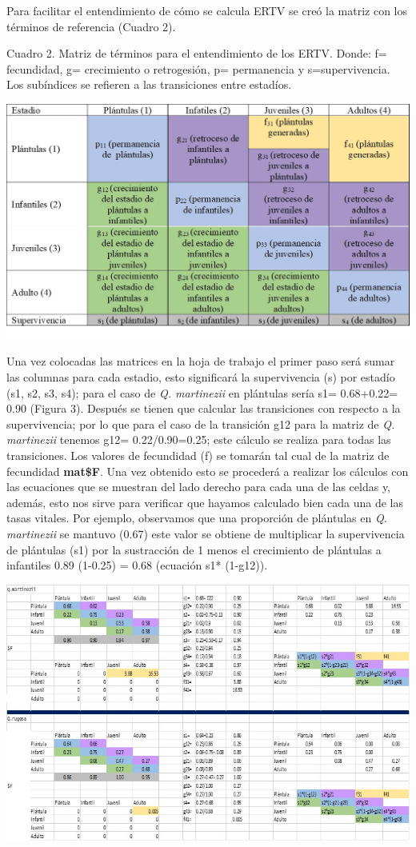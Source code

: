 \documentclass[
]{book}
\theoremstyle{definition}
\theoremstyle{definition}
\theoremstyle{definition}
\theoremstyle{definition}
\theoremstyle{remark}
\begin{document}
Para facilitar el entendimiento de cómo se calcula ERTV se creó la matriz con los términos de referencia (Cuadro 2).

Cuadro 2. Matriz de términos para el entendimiento de los ERTV. Donde: f= fecundidad, g= crecimiento o retrogesión, p= permanencia y s=supervivencia. Los subíndices se refieren a las transiciones entre estadíos.

\includegraphics{Figures/imagen2.jpg}

Una vez colocadas las matrices en la hoja de trabajo el primer paso será sumar las columnas para cada estadio, esto significará la supervivencia (s) por estadío (s1, s2, s3, s4); para el caso de \emph{Q. martinezii} en plántulas sería s1= 0.68+0.22= 0.90 (Figura 3). Después se tienen que calcular las transiciones con respecto a la supervivencia; por lo que para el caso de la transición g12 para la matriz de \emph{Q. martinezii} tenemos g12= 0.22/0.90=0.25; este cálculo se realiza para todas las transiciones. Los valores de fecundidad (f) se tomarán tal cual de la matriz de fecundidad \textbf{mat\$F}. Una vez obtenido esto se procederá a realizar los cálculos con las ecuaciones que se muestran del lado derecho para cada una de las celdas y, además, esto nos sirve para verificar que hayamos calculado bien cada una de las tasas vitales. Por ejemplo, observamos que una proporción de plántulas en \emph{Q. martinezii} se mantuvo (0.67) este valor se obtiene de multiplicar la supervivencia de plántulas (s1) por la sustracción de 1 menos el crecimiento de plántulas a infantiles 0.89 (1-0.25) = 0.68 (ecuación s1* (1-g12)).

\includegraphics{Figures/imagen3.jpg}
\end{document}
